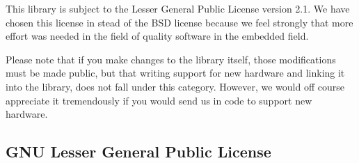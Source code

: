 This library is subject to the Lesser General Public License version 2.1.
We have chosen this license in stead of the BSD license because we feel strongly
that more effort was needed in the field of quality software in the embedded field.

Please note that if you make changes to the library itself, those modifications must be
made public, but that writing support for new hardware and linking it into the library,
does not fall under this category. However, we would off course appreciate it tremendously
if you would send us in code to support new hardware.

\subsection{GNU Lesser General Public License}


